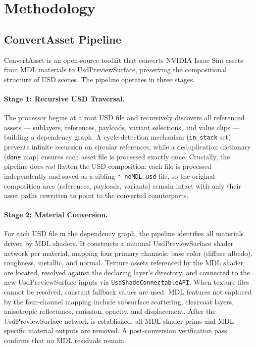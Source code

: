 \section{Methodology}
\label{sec:methodology}

\subsection{ConvertAsset Pipeline}
\label{sec:pipeline}

ConvertAsset is an open-source toolkit that converts NVIDIA Isaac Sim assets
from MDL materials to UsdPreviewSurface, preserving the compositional structure
of USD scenes. The pipeline operates in three stages.

\paragraph{Stage 1: Recursive USD Traversal.}
The processor begins at a root USD file and recursively discovers all
referenced assets --- sublayers, references, payloads, variant selections, and
value clips --- building a dependency graph.  A cycle-detection mechanism
(\texttt{in\_stack} set) prevents infinite recursion on circular references,
while a deduplication dictionary (\texttt{done} map) ensures each asset file is
processed exactly once. Crucially, the pipeline does \emph{not} flatten the USD
composition: each file is processed independently and saved as a sibling
\texttt{*\_noMDL.usd} file, so the original composition arcs (references,
payloads, variants) remain intact with only their asset paths rewritten to
point to the converted counterparts.

\paragraph{Stage 2: Material Conversion.}
For each USD file in the dependency graph, the pipeline identifies all
materials driven by MDL shaders. It constructs a minimal UsdPreviewSurface
shader network per material, mapping four primary channels: base color (diffuse
albedo), roughness, metallic, and normal. Texture assets referenced by the MDL
shader are located, resolved against the declaring layer's directory, and
connected to the new UsdPreviewSurface inputs via \texttt{UsdShadeConnectableAPI}.
When texture files cannot be resolved, constant fallback values are used.
MDL features not captured by the four-channel mapping include subsurface
scattering, clearcoat layers, anisotropic reflectance, emission, opacity, and
displacement. After the UsdPreviewSurface network is established, all MDL shader prims and
MDL-specific material outputs are removed. A post-conversion verification pass
confirms that no MDL residuals remain.

